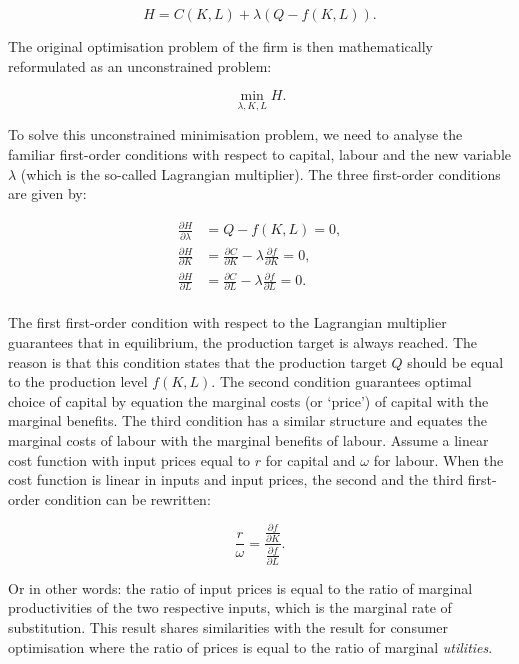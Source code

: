 \documentclass[
]{book}
\begin{document}
\begin{equation}
 H = C(K,L) + \lambda(Q - f(K,L)).
\end{equation}

The original optimisation problem of the firm is then mathematically reformulated as an unconstrained problem:

\begin{equation}
\displaystyle{\min_{\lambda, K,L} H}.
\end{equation}

To solve this unconstrained minimisation problem, we need to analyse the familiar first-order conditions with respect to capital, labour and the new variable \(\lambda\) (which is the so-called Lagrangian multiplier). The three first-order conditions are given by:

\begin{align}
\frac{\partial H}{\partial \lambda} &=Q - f(K,L) = 0,\\
\frac{\partial H}{\partial K} &= \frac{\partial C}{\partial K} - \lambda\frac{\partial f}{\partial K}= 0,\\
\frac{\partial H}{\partial L} &= \frac{\partial C}{\partial L} - \lambda\frac{\partial f}{\partial L}= 0.\\
\end{align}

The first first-order condition with respect to the Lagrangian multiplier guarantees that in equilibrium, the production target is always reached. The reason is that this condition states that the production target \(Q\) should be equal to the production level \(f(K,L)\). The second condition guarantees optimal choice of capital by equation the marginal costs (or `price') of capital with the marginal benefits. The third condition has a similar structure and equates the marginal costs of labour with the marginal benefits of labour. Assume a linear cost function with input prices equal to \(r\) for capital and \(\omega\) for labour. When the cost function is linear in inputs and input prices, the second and the third first-order condition can be rewritten:

\begin{equation}
\frac{r}{\omega} = \frac{\frac{\partial f}{\partial K}}{\frac{\partial f}{\partial L}}.
\end{equation}

Or in other words: the ratio of input prices is equal to the ratio of marginal productivities of the two respective inputs, which is the marginal rate of substitution. This result shares similarities with the result for consumer optimisation where the ratio of prices is equal to the ratio of marginal \emph{utilities}.
\end{document}
